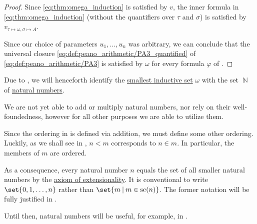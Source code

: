 \begin{proof}
  Since \eqref{eq:thm:omega_induction} is satisfied by \( v \), the inner formula in \eqref{eq:thm:omega_induction} (without the quantifiers over \( \tau \) and \( \sigma \)) is satisfied by \( v_{\tau \mapsto \omega, \sigma \mapsto A} \).

  Since our choice of parameters \( u_1, \ldots, u_n \) was arbitrary, we can conclude that the universal closure \eqref{eq:def:peano_arithmetic/PA3_quantified} of \eqref{eq:def:peano_arithmetic/PA3} is satisfied by \( \omega \) for every formula \( \varphi \) of .
\end{proof}

\begin{remark}\label{rem:set_theory_natural_numbers_without_operations}
  Due to , we will henceforth identify the \hyperref[thm:smallest_inductive_set_existence]{smallest inductive set} \( \omega \) with the set \( \BbbN \) of \hyperref[def:natural_numbers]{natural numbers}.

  We are not yet able to add or multiply natural numbers, nor rely on their well-foundedness, however for all other purposes we are able to utilize them.

  Since the ordering in  is defined via addition, we must define some other ordering. Luckily, as we shall see in , \( n < m \) corresponds to \( n \in m \). In particular, the members of \( m \) are ordered.

  As a consequence, every natural number \( n \) equals the set of all smaller natural numbers by the \hyperref[def:naive_set_theory/extensionality]{axiom of extensionality}. It is conventional to write \( \set{ 0, 1, \ldots, n } \) rather than \( \set{ m \given m \in \op{sc}(n) } \). The former notation will be fully justified in .

  Until then, natural numbers will be useful, for example, in .
\end{remark}
